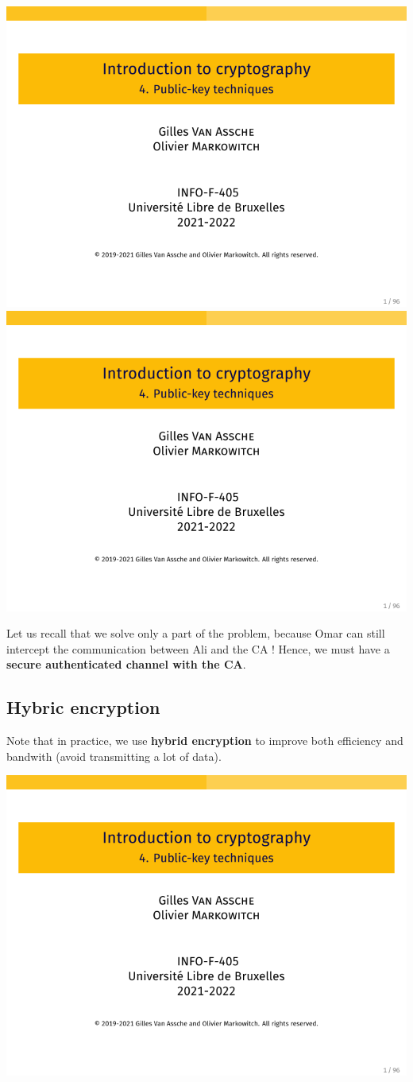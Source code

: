 \documentclass[../Cryptography.tex]{subfiles}
\begin{document}
\begin{center}
    \includegraphics[width=0.45\linewidth, page=9]{Slides/4-Public.pdf}
    \includegraphics[width=0.45\linewidth, page=10]{Slides/4-Public.pdf}
\end{center}

Let us recall that we solve only a part of the problem, because Omar can still intercept the communication between Ali and the CA ! Hence, we must have a \textbf{secure authenticated channel with the CA}. \\

\subsection{Hybric encryption}
Note that in practice, we use \textbf{hybrid encryption} to improve both efficiency and bandwith (avoid transmitting a lot of data). 
\begin{center}
    \includegraphics[width=0.8\linewidth, page=13]{Slides/4-Public.pdf}
\end{center}
\end{document}
